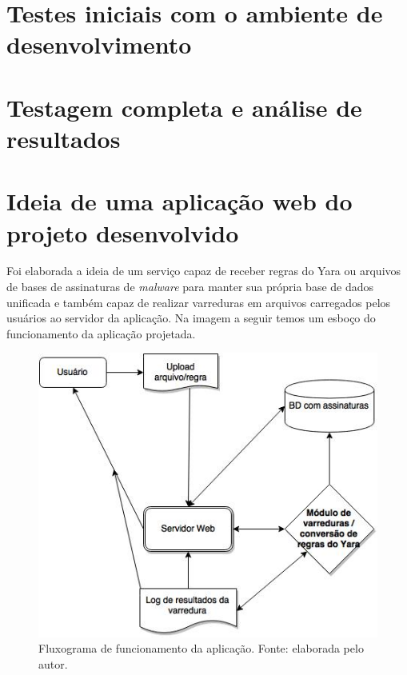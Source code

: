 \section{Testes iniciais com o ambiente de desenvolvimento}
\label{s.testesiniciais}

\section{Testagem completa e análise de resultados}
\label{s.testefull}

\section{Ideia de uma aplicação web do projeto desenvolvido}
\label{s.prototipo}

Foi elaborada a ideia de um serviço capaz de receber regras do Yara ou arquivos de bases de assinaturas de \textit{malware}
para manter sua própria base de dados unificada e também capaz de realizar varreduras em arquivos carregados pelos usuários
ao servidor da aplicação. Na imagem a seguir temos um esboço do funcionamento da aplicação projetada.

\begin{figure}[H]
  \includegraphics[scale=0.6]{figs/flux_prototipo}
  \centering
  \caption{Fluxograma de funcionamento da aplicação. Fonte: elaborada pelo autor.}
  \label{f.flux_prototipo}
\end{figure}
